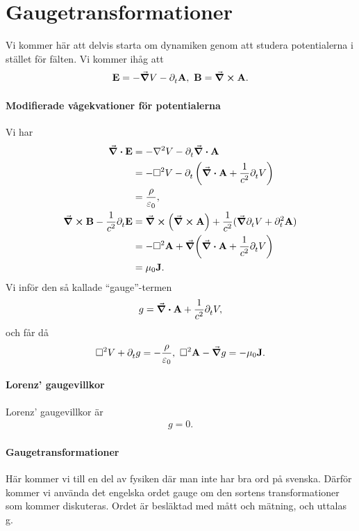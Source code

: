 \section{Gaugetransformationer}

Vi kommer här att delvis starta om dynamiken genom att studera potentialerna i stället för fälten. Vi kommer ihåg att
\begin{align*}
	\vb{E} = -\grad{V} - \partial_{t}^{}\vb{A},\ \vb{B} = \curl{\vb{A}}.
\end{align*}

\paragraph{Modifierade vågekvationer för potentialerna}
Vi har
\begin{align*}
	\div{\vb{E}}                                   &= -\laplacian{V} - \del{t}{\div{\vb{A}}} \\
	                                               &= -\dalemb{V} - \del{t}{\left(\div{\vb{A}} + \frac{1}{c^{2}}\del{t}{V}\right)} \\
	                                               &= \frac{\rho}{\varepsilon_{0}}, \\
	\curl{\vb{B}} - \frac{1}{c^{2}}\del{t}{\vb{E}} &= \curl(\curl{\vb{A}}) + \frac{1}{c^{2}}(\grad{\del{t}{V}} + \del[2]{t}{\vb{A}}) \\
	                                               &= -\dalemb{\vb{A}} + \grad(\div{\vb{A}} + \frac{1}{c^{2}}\del{t}{V}) \\
	                                               &= \mu_{0}\vb{J}.
\end{align*}
Vi inför den så kallade ``gauge''-termen
\begin{align*}
	g = \div{\vb{A}} + \frac{1}{c^{2}}\partial_{t}^{}V,
\end{align*}
och får då
\begin{align*}
	\dalemb{V} + \del{t}{g} = -\frac{\rho}{\varepsilon_{0}},\ \dalemb{\vb{A}} - \grad{g} = -\mu_{0}\vb{J}.
\end{align*}

\paragraph{Lorenz' gaugevillkor}
Lorenz' gaugevillkor är
\begin{align*}
	g = 0.
\end{align*}

\paragraph{Gaugetransformationer}
Här kommer vi till en del av fysiken där man inte har bra ord på svenska. Därför kommer vi använda det engelska ordet gauge om den sortens transformationer som kommer diskuteras. Ordet är besläktad med mått och mätning, och uttalas g.

